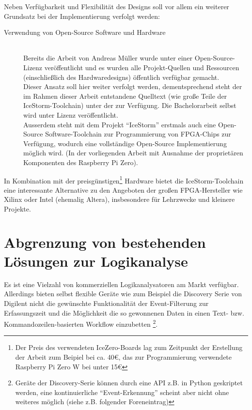 Neben Verfügbarkeit und Flexibilität des Designs soll vor allem ein weiterer Grundsatz bei der Implementierung verfolgt werden:
\begin{description}
\item[Verwendung von Open-Source Software und Hardware] \hfill \\
Bereits die Arbeit von Andreas Müller wurde unter einer Open-Source-Lizenz veröffentlicht und es wurden alle Projekt-Quellen und Ressourcen (einschließlich des Hardwaredesigns) öffentlich verfügbar gemacht.\\
Dieser Ansatz soll hier weiter verfolgt werden, dementsprechend steht der im Rahmen dieser Arbeit entstandene Quelltext (wie große Teile der IceStorm-Toolchain) unter der  zur Verfügung. Die Bachelorarbeit selbst wird unter  Lizenz veröffentlicht.\\
Ausserdem steht mit dem Projekt ``IceStorm'' erstmals auch eine Open-Source Software-Toolchain zur Programmierung von FPGA-Chips zur Verfügung, wodurch eine vollständige Open-Source Implementierung möglich wird. (In der vorliegenden Arbeit mit Ausnahme der proprietären Komponenten des Raspberry Pi Zero).
\end{description}
In Kombination mit der preisgünstigen\footnote{Der Preis des verwendeten IceZero-Boards lag zum Zeitpunkt der Erstellung der Arbeit zum Beipiel bei ca. 40€, das zur Programmierung verwendete Raspberry Pi Zero W bei unter 15€} Hardware bietet die IceStorm-Toolchain eine interessante Alternative zu den Angeboten der großen FPGA-Hersteller wie Xilinx oder Intel (ehemalig Altera), insbesondere für Lehrzwecke und kleinere Projekte.

\clearpage 
 
\section{Abgrenzung von bestehenden Lösungen zur Logikanalyse}

Es ist eine Vielzahl von kommerziellen Logikanalysatoren am Markt verfügbar. Allerdings bieten selbst flexible Geräte wie zum Beispiel die Discovery Serie von Digilent nicht die gewünschte Funktionalität der Event-Filterung zur Erfassungszeit und die Möglichkeit die so gewonnenen Daten in einen Text- bzw. Kommandozeilen-basierten Workflow einzubetten \footnote{Geräte der Discovery-Serie können durch eine \acrshort{API} z.B. in Python geskriptet werden, eine kontinuierliche ``Event-Erkennung'' scheint aber nicht ohne weiteres möglich (siehe z.B. folgender Foreneintrag\cite{forum:digilent}) }. 

